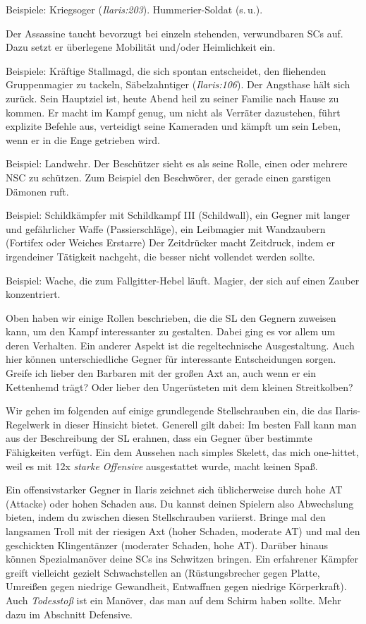 Beispiele: Kriegsoger (\textit{Ilaris:203}). Hummerier-Soldat (s.\,u.). 


Der Assassine taucht bevorzugt bei einzeln stehenden, verwundbaren SCs auf.
Dazu setzt er überlegene Mobilität und/oder Heimlichkeit ein.

Beispiele: Kräftige Stallmagd, die sich spontan entscheidet, den fliehenden Gruppenmagier zu tackeln, Säbelzahntiger (\textit{Ilaris:106}).
Der Angsthase hält sich zurück. Sein Hauptziel ist, heute Abend heil zu seiner Familie nach Hause zu kommen.
Er macht im Kampf genug, um nicht als Verräter dazustehen, führt explizite Befehle aus, verteidigt seine Kameraden und kämpft um sein Leben, wenn er in die Enge getrieben wird.

Beispiel: Landwehr.
Der Beschützer sieht es als seine Rolle, einen oder mehrere NSC zu schützen.
Zum Beispiel den Beschwörer, der gerade einen garstigen Dämonen ruft.

Beispiel: Schildkämpfer mit Schildkampf III (Schildwall), ein Gegner mit langer und gefährlicher Waffe (Passierschläge), ein Leibmagier mit Wandzaubern (Fortifex oder Weiches Erstarre)
Der Zeitdrücker macht Zeitdruck, indem er irgendeiner Tätigkeit nachgeht, die besser nicht vollendet werden sollte.

Beispiel: Wache, die zum Fallgitter-Hebel läuft. Magier, der sich auf einen Zauber konzentriert.

Oben haben wir einige Rollen beschrieben, die die SL den Gegnern zuweisen kann, um den Kampf interessanter zu gestalten.
Dabei ging es vor allem um deren Verhalten. Ein anderer Aspekt ist die regeltechnische Ausgestaltung.
Auch hier können unterschiedliche Gegner für interessante Entscheidungen sorgen.
Greife ich lieber den Barbaren mit der großen Axt an, auch wenn er ein Kettenhemd trägt?
Oder lieber den Ungerüsteten mit dem kleinen Streitkolben?

Wir gehen im folgenden auf einige grundlegende Stellschrauben ein, die das Ilaris-Regelwerk in dieser Hinsicht bietet.
Generell gilt dabei: Im besten Fall kann man aus der Beschreibung der SL erahnen, dass ein Gegner über bestimmte Fähigkeiten verfügt.
Ein dem Aussehen nach simples Skelett, das mich one-hittet, weil es mit 12x \emph{starke Offensive} ausgestattet wurde, macht keinen Spaß.
\platz


Ein offensivstarker Gegner in Ilaris zeichnet sich üblicherweise durch hohe AT (Attacke) oder hohen Schaden aus.
Du kannst deinen Spielern also Abwechslung bieten, indem du zwischen diesen Stellschrauben variierst. 
Bringe mal den langsamen Troll mit der riesigen Axt (hoher Schaden, moderate AT) und mal den geschickten Klingentänzer (moderater Schaden, hohe AT).
Darüber hinaus können Spezialmanöver deine SCs ins Schwitzen bringen. Ein erfahrener Kämpfer greift vielleicht gezielt Schwachstellen an (Rüstungsbrecher gegen Platte, Umreißen gegen niedrige Gewandheit, Entwaffnen gegen niedrige Körperkraft).
Auch \textit{Todesstoß} ist ein Manöver, das man auf dem Schirm haben sollte. Mehr dazu im Abschnitt Defensive. 

